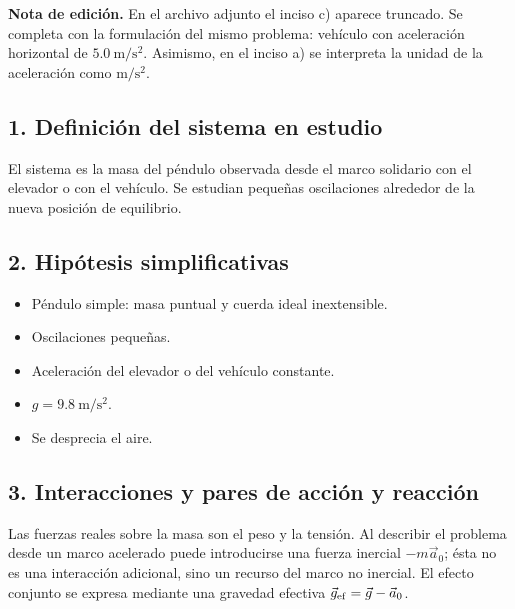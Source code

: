 \documentclass[12pt]{article}
\newcommand{\paso}[2]{%
  \subsection*{\color{AzulFisica}#1. #2}%
}
\begin{document}
\textbf{Nota de edición.} En el archivo adjunto el inciso c) aparece truncado. Se completa con la formulación del mismo problema: vehículo con aceleración horizontal de $\SI{5.0}{\meter\per\second\squared}$. Asimismo, en el inciso a) se interpreta la unidad de la aceleración como $\si{\meter\per\second\squared}$.

\paso{1}{Definición del sistema en estudio}
El sistema es la masa del péndulo observada desde el marco solidario con el elevador o con el vehículo. Se estudian pequeñas oscilaciones alrededor de la nueva posición de equilibrio.

\paso{2}{Hipótesis simplificativas}
\begin{itemize}[itemsep=2pt]
  \item Péndulo simple: masa puntual y cuerda ideal inextensible.
  \item Oscilaciones pequeñas.
  \item Aceleración del elevador o del vehículo constante.
  \item $g=\SI{9.8}{\meter\per\second\squared}$.
  \item Se desprecia el aire.
\end{itemize}

\paso{3}{Interacciones y pares de acción y reacción}
Las fuerzas reales sobre la masa son el peso y la tensión. Al describir el problema desde un marco acelerado puede introducirse una fuerza inercial $-m\vec a_0$; ésta no es una interacción adicional, sino un recurso del marco no inercial. El efecto conjunto se expresa mediante una gravedad efectiva $\vec g_{\rm ef}=\vec g-\vec a_0$.
\end{document}
